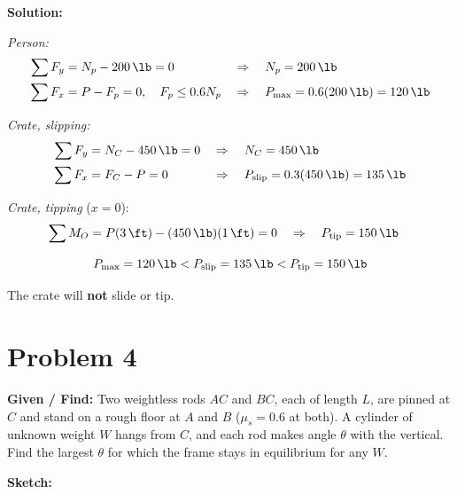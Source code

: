 \documentclass[11pt]{article}
\newcommand{\problem}[1]{\clearpage\section*{Problem #1}}
\begin{document}
\textbf{Solution:}

\textit{Person:}
\begin{align*}
    \sum F_y &= N_p - \SI{200}{\lb} = 0 &&\Rightarrow\quad N_p = \SI{200}{\lb} \\
    \sum F_x &= P - F_p = 0, \quad F_p \le 0.6N_p &&\Rightarrow\quad P_{\max} = 0.6(\SI{200}{\lb}) = \SI{120}{\lb}
\end{align*}

\textit{Crate, slipping:}
\begin{align*}
    \sum F_y &= N_C - \SI{450}{\lb} = 0 &&\Rightarrow\quad N_C = \SI{450}{\lb} \\
    \sum F_x &= F_C - P = 0 &&\Rightarrow\quad P_{\text{slip}} = 0.3(\SI{450}{\lb}) = \SI{135}{\lb}
\end{align*}

\textit{Crate, tipping} ($x = 0$):
\begin{align*}
    \sum M_O &= P(\SI{3}{\ft}) - (\SI{450}{\lb})(\SI{1}{\ft}) = 0 &&\Rightarrow\quad P_{\text{tip}} = \SI{150}{\lb}
\end{align*}

\[
    P_{\max} = \SI{120}{\lb} < P_{\text{slip}} = \SI{135}{\lb} < P_{\text{tip}} = \SI{150}{\lb}
\]

\begin{finalanswer}
    The crate will \textbf{not} slide or tip.
\end{finalanswer}

\problem{4}

\textbf{Given / Find:} Two weightless rods $AC$ and $BC$, each of length $L$, are pinned at $C$ and stand on a rough floor at $A$ and $B$ ($\mu_s = 0.6$ at both). A cylinder of unknown weight $W$ hangs from $C$, and each rod makes angle $\theta$ with the vertical. Find the largest $\theta$ for which the frame stays in equilibrium for any $W$.

\textbf{Sketch:}
\end{document}
